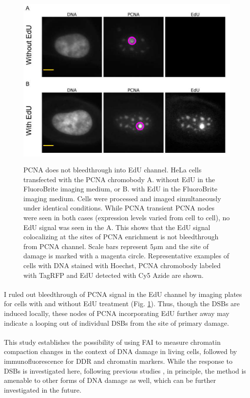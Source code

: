 \begin{figure}[htp]
    {\hfill\includegraphics[clip, width=1\linewidth]{figures/bleed.png}\hspace*{\fill}}
    \caption{PCNA does not bleedthrough into EdU channel. HeLa cells transfected with the PCNA chromobody A. without EdU in the FluoroBrite imaging medium, or B. with EdU in the FluoroBrite imaging medium. Cells were processed and imaged simultaneously under identical conditions. While PCNA transient PCNA nodes were seen in both cases (expression levels varied from cell to cell), no EdU signal was seen in the A. This shows that the EdU signal colocalizing at the sites of PCNA enrichment is not bleedthrough from PCNA channel. Scale bars represent 5$\mu$m and the site of damage is marked with a magenta circle. Representative examples of cells with DNA stained with Hoechst, PCNA chromobody labeled with TagRFP and EdU detected with Cy5 Azide are shown.}
    {\label{fig:bleed}}
\end{figure}

\paragraph*{} I ruled out bleedthrough of PCNA signal in the EdU channel by imaging plates for cells with and without EdU treatment (Fig. \ref{fig:bleed}). Thus, though the DSBs are induced locally, these nodes of PCNA incorporating EdU further away may indicate a looping out of individual DSBs from the site of primary damage.

\paragraph*{} This study establishes the possibility of using FAI to measure chromatin compaction changes in the context of DNA damage in living cells, followed by immunofluorescence for DDR and chromatin markers. While the response to DSBs is investigated here, following previous studies \cite{kruhlak2006changes,BURGESS20141703}, in principle, the method is amenable to other forms of DNA damage as well, which can be further investigated in the future.

